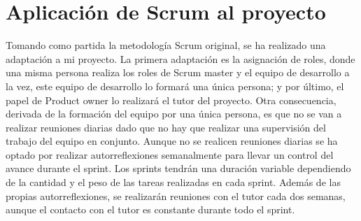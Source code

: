 \begin{table}[h]
\centering
{}
\caption{Comparativa de las metodologías de desarrollo}
\end{table}



\section{Aplicación de Scrum al proyecto}

Tomando como partida la metodología Scrum original, se ha realizado una adaptación a mi proyecto. La primera adaptación es la asignación de roles, donde una misma persona realiza los roles de Scrum master y el equipo de desarrollo a la vez, este equipo de desarrollo lo formará una única persona; y por último, el papel de Product owner lo realizará el tutor del proyecto. Otra consecuencia, derivada de la formación del equipo por una única persona, es que no se van a realizar reuniones diarias dado que no hay que realizar una supervisión del trabajo del equipo en conjunto. Aunque no se realicen reuniones diarias se ha optado por realizar autorreflexiones semanalmente para llevar un control del avance durante el sprint. Los sprints tendrán una duración variable dependiendo de la cantidad y el peso de las tareas realizadas en cada sprint. Además de las propias autorreflexiones, se realizarán reuniones con el tutor cada dos semanas, aunque el contacto con el tutor es constante durante todo el sprint.



